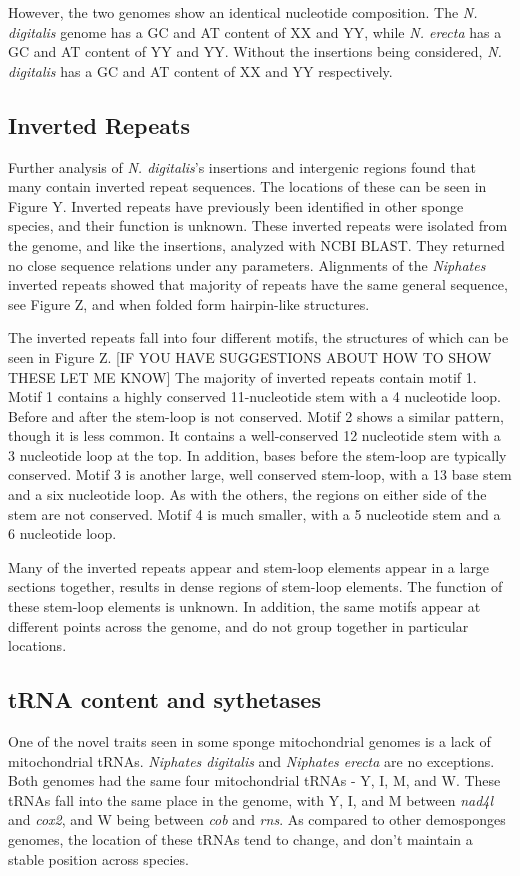 \documentclass[../main.tex]{subfiles}
\begin{document}
However, the two genomes show an identical nucleotide composition.  The \emph{N. digitalis} genome has a GC and AT content of XX and YY, while \emph{N. erecta} has a GC and AT content of YY and YY. Without the insertions being considered, \emph{N. digitalis} has a GC and AT content of XX and YY respectively.  

\subsection{Inverted Repeats}

Further analysis of \emph{N. digitalis}'s insertions and intergenic regions found that many contain inverted repeat sequences. The locations of these can be seen in Figure Y. Inverted repeats have previously been identified in other sponge species, and their function is unknown. These inverted repeats were isolated from the genome, and like the insertions, analyzed with NCBI BLAST. They returned no close sequence relations under any parameters. Alignments of the \emph{Niphates} inverted repeats showed that majority of repeats have the same general sequence, see Figure Z, and when folded form hairpin-like structures.

The inverted repeats fall into four different motifs, the structures of which can be seen in Figure Z. [IF YOU HAVE SUGGESTIONS ABOUT HOW TO SHOW THESE LET ME KNOW] The majority of inverted repeats contain motif 1. Motif 1 contains a highly conserved 11-nucleotide stem with a 4 nucleotide loop. Before and after the stem-loop is not conserved. Motif 2 shows a similar pattern, though it is less common. It contains a well-conserved 12 nucleotide stem with a 3 nucleotide loop at the top. In addition, bases before the stem-loop are typically conserved. Motif 3 is another large, well conserved stem-loop, with a 13 base stem and a six nucleotide loop. As with the others, the regions on either side of the stem are not conserved. Motif 4 is much smaller, with a 5 nucleotide stem and a 6 nucleotide loop. 

Many of the inverted repeats appear and stem-loop elements appear in a large sections together, results in dense regions of stem-loop elements. The function of these stem-loop elements is unknown. In addition, the same motifs appear at different points across the genome, and do not group together in particular locations.

\subsection{tRNA content and sythetases}
One of the novel traits seen in some sponge mitochondrial genomes is a lack of mitochondrial tRNAs. \emph{Niphates digitalis} and \emph{Niphates erecta} are no exceptions. Both genomes had the same four mitochondrial tRNAs - Y, I, M, and W. These tRNAs fall into the same place in the genome, with Y, I, and M between \emph{nad4l} and \emph{cox2}, and W being between \emph{cob} and \emph{rns}. As compared to other demosponges genomes, the location of these tRNAs tend to change, and don't maintain a stable position across species.
\end{document}
